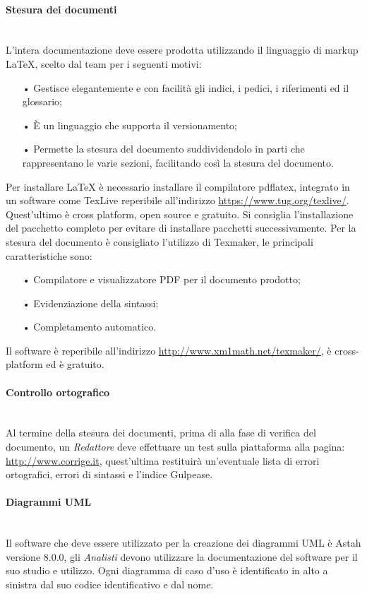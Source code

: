 \paragraph{Stesura dei documenti}\mbox{}\\
L'intera documentazione deve essere prodotta utilizzando il {linguaggio di markup} \LaTeX{}, scelto dal team per i seguenti motivi:
\begin{itemize}
\item[•] Gestisce elegantemente e con facilità gli indici, i pedici, i riferimenti ed il glossario;
\item[•] È un linguaggio che supporta il {versionamento};
\item[•] Permette la stesura del documento suddividendolo in parti che rappresentano le varie sezioni, facilitando così la stesura del documento.
\end{itemize}
Per installare \LaTeX{} è necessario installare il compilatore pdflatex, integrato in un software come TexLive reperibile all'indirizzo \url{https://www.tug.org/texlive/}. Quest'ultimo è {cross platform}, {open source} e gratuito. Si consiglia l'installazione del pacchetto completo per evitare di installare pacchetti successivamente.
Per la stesura del documento è consigliato l'utilizzo di Texmaker, le principali caratteristiche sono:
\begin{itemize}
	\item[•] Compilatore e visualizzatore {PDF} per il documento prodotto;
	\item[•] Evidenziazione della sintassi;
	\item[•] Completamento automatico.
\end{itemize}  
Il software è reperibile all'indirizzo \url{http://www.xm1math.net/texmaker/}, è cross-platform ed è gratuito.

\paragraph{Controllo ortografico}\mbox{}\\
Al termine della stesura dei documenti, prima di alla fase di verifica del documento, un \textit{Redattore} deve effettuare un test sulla piattaforma alla pagina: \url{ http://www.corrige.it}, quest’ultima restituirà un’eventuale lista di errori ortografici, errori di sintassi e l’indice {Gulpease}.

\paragraph{Diagrammi UML}\mbox{}\\
Il software che deve essere utilizzato per la creazione dei diagrammi UML è Astah versione 8.0.0, gli \textit{Analisti} devono utilizzare la documentazione del software per il suo studio e utilizzo.
Ogni diagramma di caso d’uso è identificato in alto a sinistra dal suo codice identificativo e dal nome.

